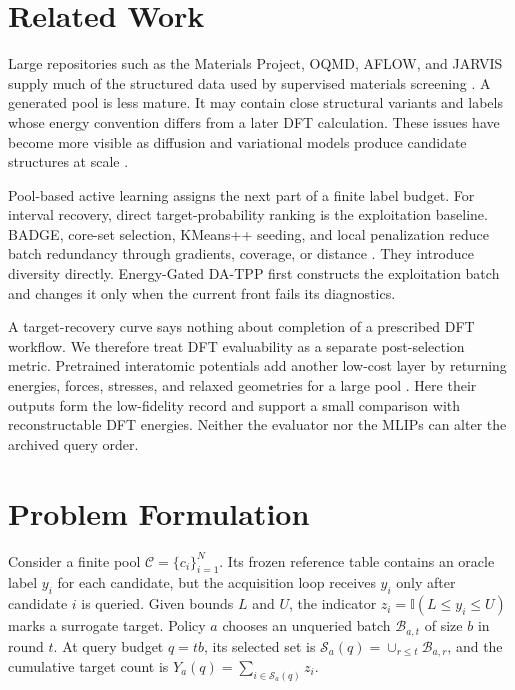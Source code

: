 \section{Related Work}

Large repositories such as the Materials Project, OQMD, AFLOW, and JARVIS
supply much of the structured data used by supervised materials screening
\cite{ref-materials-project,ref-oqmd,ref-aflow,ref-jarvis}. A generated pool is
less mature. It may contain close structural variants and labels whose energy
convention differs from a later DFT calculation. These issues have become more
visible as diffusion and variational models produce candidate structures at
scale \cite{ref-cdvae,ref-diffcsp,ref-mattergen,ref-chemeleon}.

Pool-based active learning assigns the next part of a finite label budget. For
interval recovery, direct target-probability ranking is the exploitation
baseline. BADGE, core-set selection, KMeans++ seeding, and local penalization
reduce batch redundancy through gradients, coverage, or distance
\cite{ref-badge,ref-coreset,ref-kmeanspp,ref-localpenalization}. They introduce
diversity directly. Energy-Gated DA-TPP first constructs the exploitation batch
and changes it only when the current front fails its diagnostics.

A target-recovery curve says nothing about completion of a prescribed DFT
workflow. We therefore treat DFT evaluability as a separate post-selection
metric. Pretrained interatomic potentials add another
low-cost layer by returning energies, forces, stresses, and relaxed geometries
for a large pool \cite{ref-chgnet,ref-macemp}. Here their outputs form the
low-fidelity record and support a small comparison with reconstructable DFT
energies. Neither the evaluator nor the MLIPs can alter the archived query order.

\section{Problem Formulation}

Consider a finite pool $\mathcal{C}=\{c_i\}_{i=1}^{N}$. Its frozen reference
table contains an oracle label $y_i$ for each candidate, but the acquisition
loop receives $y_i$ only after candidate $i$ is queried. Given bounds $L$ and
$U$, the indicator $z_i=\mathbb{I}(L\leq y_i\leq U)$ marks a surrogate target.
Policy $a$ chooses an unqueried batch $\mathcal{B}_{a,t}$ of size $b$ in round
$t$. At query budget $q=tb$, its selected set is
$\mathcal{S}_a(q)=\cup_{r\leq t}\mathcal{B}_{a,r}$, and the cumulative target
count is $Y_a(q)=\sum_{i\in\mathcal{S}_a(q)}z_i$.

